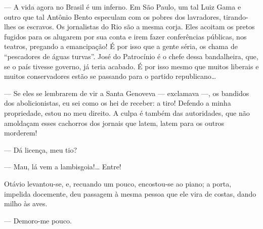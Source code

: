 \label{Ref3}
--- A vida agora no Brasil é um inferno. Em São Paulo, um tal Luiz Gama e
outro que tal Antônio Bento especulam com os pobres dos lavradores,
tirando-lhes os escravos. Os jornalistas do Rio são a mesma corja. Eles
acoitam os pretos fugidos para os alugarem por sua conta e irem fazer
conferências públicas, nos teatros, pregando a emancipação! É por isso
que a gente séria, os chama de ``pescadores de águas turvas''. José do 
Patrocínio é o chefe dessa bandalheira, que, se o país tivesse
governo, já teria acabado. É por isso mesmo que muitos liberais e muitos
conservadores estão se passando para o partido republicano\ldots{ 



--- Se eles se lembrarem de vir a Santa Genoveva --- exclamava ---, os bandidos
dos abolicionistas, eu sei como os hei de receber: a tiro! Defendo a
minha propriedade, estou no meu direito. A culpa é também das
autoridades, que não amoldaçam esses cachorros dos
jornais que latem, latem para os outros morderem!


--- Dá licença, meu tio?

--- Mau, lá vem a lambisgoia!\ldots{} Entre!

Otávio levantou-se, e, recuando um pouco, encostou-se ao piano; a porta,
impelida docemente, deu passagem à mesma pessoa que ele vira de costas,
dando milho às aves.


--- Demoro-me pouco.


}
